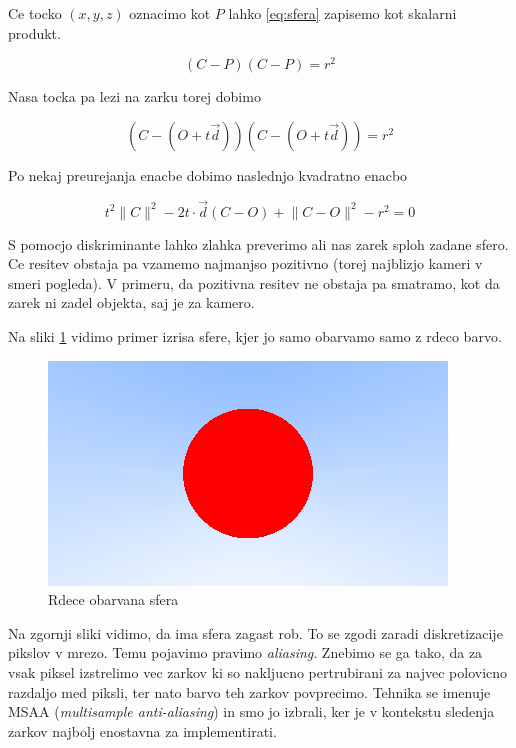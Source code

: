 \documentclass[12pt, a4paper]{article}
\begin{document}
Ce tocko $(x,y,z)$ oznacimo kot $P$ lahko \ref{eq:sfera} zapisemo kot skalarni produkt.

\begin{equation}
	(C - P)(C - P) = r^2
\end{equation}

Nasa tocka pa lezi na zarku torej dobimo

\begin{equation}
	(C - (O + t \vec{d}))(C - (O + t \vec{d})) = r^2
\end{equation}

Po nekaj preurejanja enacbe dobimo naslednjo kvadratno enacbo

\begin{equation}
	t^2 \lVert C \rVert ^2  - 2 t \cdot \vec{d} (C - O) + \lVert C - O \rVert ^2  - r^2 = 0
\end{equation}

S pomocjo diskriminante lahko zlahka preverimo ali nas zarek sploh zadane sfero. Ce resitev obstaja pa vzamemo
najmanjso pozitivno (torej najblizjo kameri v smeri pogleda). V primeru, da pozitivna resitev ne obstaja pa
smatramo, kot da zarek ni zadel objekta, saj je za kamero.

Na sliki \ref{fig:red_sphere} vidimo primer izrisa sfere, kjer jo samo obarvamo samo z rdeco barvo.

\begin{figure}[h]
	\label{fig:red_sphere}
	\includegraphics[width=\textwidth]{red_sphere}
	\caption{Rdece obarvana sfera}
\end{figure}

Na zgornji sliki vidimo, da ima sfera zagast rob. To se zgodi zaradi diskretizacije pikslov v mrezo. Temu
pojavimo pravimo \textit{aliasing}. Znebimo se ga tako, da za vsak piksel izstrelimo vec zarkov ki so nakljucno
pertrubirani za najvec polovicno razdaljo med piksli, ter nato barvo teh zarkov povprecimo. Tehnika se imenuje
MSAA (\textit{multisample anti-aliasing}) in smo jo izbrali, ker je v kontekstu sledenja zarkov najbolj
enostavna za implementirati.
\end{document}
